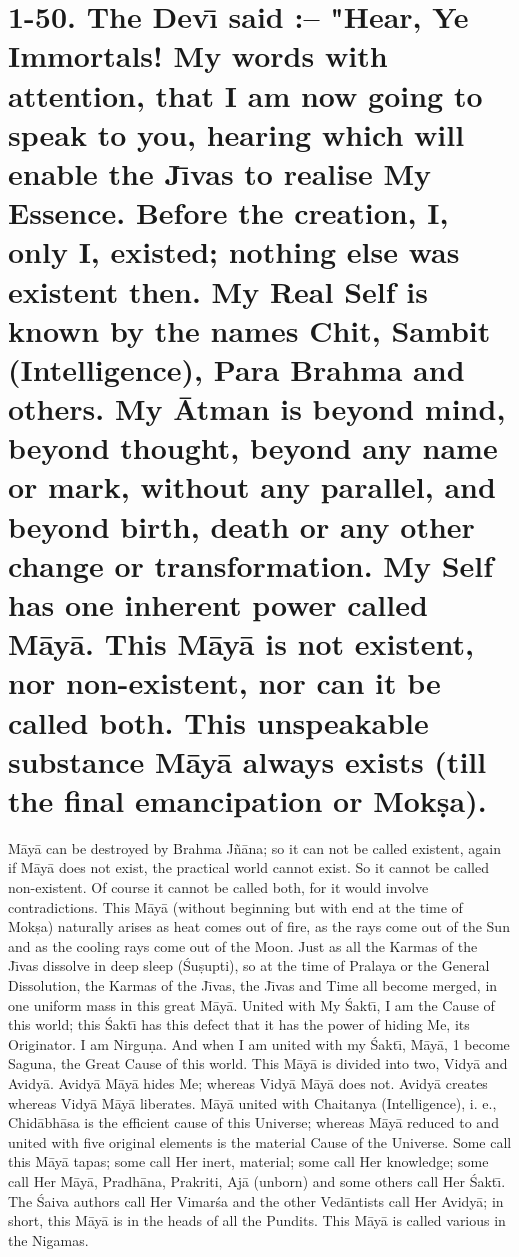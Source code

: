 \chapter{1-50. The Dev\={\i} said :-- "Hear, Ye Immortals! My words with attention, that I am now going to speak to you, hearing which will enable the J\={\i}vas to realise My Essence. Before the creation, I, only I, existed; nothing else was existent then. My Real Self is known by the names Chit, Sambit (Intelligence), Para Brahma and others. My \=Atman is beyond mind, beyond thought, beyond any name or mark, without any parallel, and beyond birth, death or any other change or transformation. My Self has one inherent power called M\=ay\=a. This M\=ay\=a is not existent, nor non-existent, nor can it be called both. This unspeakable substance M\=ay\=a always exists (till the final emancipation or Mok\d{s}a).}
M\=ay\=a can be destroyed by Brahma J\~n\=ana; so it can not be called existent, again if M\=ay\=a does not exist, the practical world cannot exist. So it cannot be called non-existent. Of course it cannot be called both, for it would involve contradictions. This M\=ay\=a (without beginning but with end at the time of Mok\d{s}a) naturally arises as heat comes out of fire, as the rays come out of the Sun and as the cooling rays come out of the Moon. Just as all the Karmas of the J\={\i}vas dissolve in deep sleep (\'Su\d{s}upti), so at the time of Pralaya or the General Dissolution, the Karmas of the J\={\i}vas, the J\={\i}vas and Time all become merged, in one uniform mass in this great M\=ay\=a. United with My \'Sakt\={\i}, I am the Cause of this world; this \'Sakt\={\i} has this defect that it has the power of hiding Me, its Originator.
I am Nirgu\d{n}a. And when I am united with my \'Sakt\={\i}, M\=ay\=a, 1 become Saguna, the Great Cause of this world. This M\=ay\=a is divided into two, Vidy\=a and Avidy\=a. Avidy\=a M\=ay\=a hides Me; whereas Vidy\=a M\=ay\=a does not. Avidy\=a creates whereas Vidy\=a M\=ay\=a liberates.
M\=ay\=a united with Chaitanya (Intelligence), i. e., Chid\=abh\=asa is the efficient cause of this Universe; whereas M\=ay\=a reduced to and united with five original elements is the material Cause of the Universe. Some call this M\=ay\=a tapas; some call Her inert, material; some call Her knowledge; some call Her M\=ay\=a, Pradh\=ana, Prakriti, Aj\=a (unborn) and some others call Her \'Sakt\={\i}. The \'Saiva authors call Her Vimar\'sa and the other Ved\=antists call Her Avidy\=a; in short, this M\=ay\=a is in the heads of all the Pundits. This M\=ay\=a is called various in the Nigamas.


